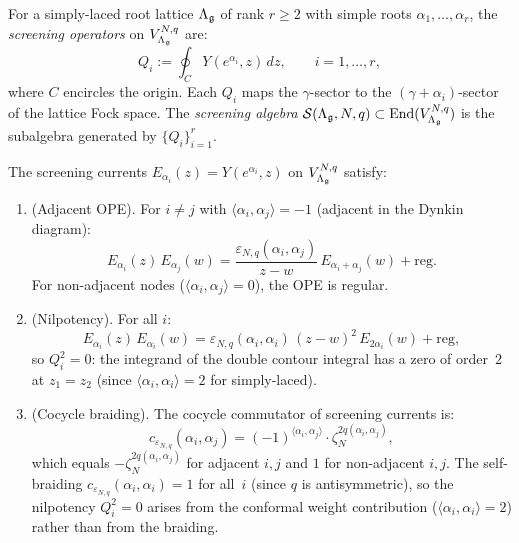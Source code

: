 \begin{construction}
\label{constr:lattice:screening}
For a simply-laced root lattice $\Lambda_{\mathfrak{g}}$ of rank $r \geq 2$
with simple roots $\alpha_1, \ldots, \alpha_r$, the
\emph{screening operators} on $V_{\Lambda_{\mathfrak{g}}}^{N,q}$ are:
\[
Q_i := \oint_C Y(e^{\alpha_i}, z)\, dz,
\qquad i = 1, \ldots, r,
\]
where $C$ encircles the origin.  Each $Q_i$ maps the
$\gamma$-sector to the $(\gamma + \alpha_i)$-sector of the
lattice Fock space.  The \emph{screening algebra}
$\mathcal{S}(\Lambda_{\mathfrak{g}}, N, q) \subset
\operatorname{End}(V_{\Lambda_{\mathfrak{g}}}^{N,q})$ is the
subalgebra generated by $\{Q_i\}_{i=1}^r$.
\end{construction}

\begin{proposition}
\label{prop:lattice:screening-structure}
The screening currents
$E_{\alpha_i}(z) = Y(e^{\alpha_i}, z)$ on
$V_{\Lambda_{\mathfrak{g}}}^{N,q}$ satisfy:
\begin{enumerate}[label=(\roman*)]
\item \textup{(}Adjacent OPE\textup{).}
  For $i \neq j$ with $\langle\alpha_i,\alpha_j\rangle = -1$
  \textup{(}adjacent in the Dynkin diagram\textup{)}:
  \[
  E_{\alpha_i}(z)\, E_{\alpha_j}(w)
  = \frac{\varepsilon_{N,q}(\alpha_i,\alpha_j)}{z - w}
    \,E_{\alpha_i+\alpha_j}(w) + \mathrm{reg}.
  \]
  For non-adjacent nodes
  ($\langle\alpha_i,\alpha_j\rangle = 0$),
  the OPE is regular.

\item \textup{(}Nilpotency\textup{).}
  For all $i$:
  \[
  E_{\alpha_i}(z)\, E_{\alpha_i}(w)
  = \varepsilon_{N,q}(\alpha_i,\alpha_i)\, (z-w)^2\,
    E_{2\alpha_i}(w) + \mathrm{reg},
  \]
  so $Q_i^2 = 0$: the integrand of the double contour integral
  has a zero of order~$2$ at $z_1 = z_2$
  \textup{(}since $\langle\alpha_i,\alpha_i\rangle = 2$ for
  simply-laced\textup{)}.

\item \textup{(}Cocycle braiding\textup{).}
  The cocycle commutator of screening currents is:
  \begin{equation}\label{eq:lattice:screening-braiding}
  c_{\varepsilon_{N,q}}(\alpha_i,\alpha_j)
  = (-1)^{\langle\alpha_i,\alpha_j\rangle}
    \cdot \zeta_N^{2q(\alpha_i,\alpha_j)},
  \end{equation}
  which equals $-\zeta_N^{2q(\alpha_i,\alpha_j)}$ for adjacent
  $i,j$ and $1$ for non-adjacent $i,j$.
  The self-braiding $c_{\varepsilon_{N,q}}(\alpha_i,\alpha_i) = 1$
  for all~$i$ \textup{(}since $q$ is antisymmetric\textup{)},
  so the nilpotency $Q_i^2 = 0$ arises from the conformal weight
  contribution \textup{(}$\langle\alpha_i,\alpha_i\rangle = 2$\textup{)}
  rather than from the braiding.
\end{enumerate}
\end{proposition}

